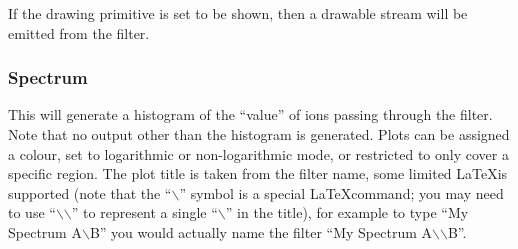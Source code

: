\documentclass[10pt]{article}
\begin{document}
If the drawing primitive is set to be shown, then a drawable stream will be emitted from the filter.
\FloatBarrier
\subsubsection{Spectrum}
 This will generate a histogram of the ``value'' of ions passing through the filter. Note that no output other than the histogram is generated. Plots can be assigned a colour, set to logarithmic or non-logarithmic mode, or restricted to only cover a specific region. The plot title is taken from the filter name, some limited \LaTeX is supported (note that the ``$\backslash$'' symbol is a special \LaTeX command; you may need to use ``$\backslash$$\backslash$'' to represent a single ``$\backslash$'' in the title), for example to type ``My Spectrum A$\backslash$B'' you would actually name the filter ``My Spectrum A$\backslash$$\backslash$B''.
 
\end{document}
